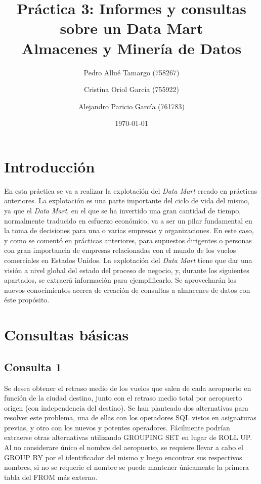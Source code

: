 \documentclass{article}
\begin{document}
\begin{titlepage}
\title{\textbf{
    {\Huge Práctica 3: Informes y consultas sobre un Data Mart}\\
    {\Large Almacenes y Minería de Datos}
}}
\author{
    Pedro Allué Tamargo (758267)
    \and
    Cristina Oriol García (755922)
    \and
    Alejandro Paricio García (761783)
}
\date{\today}
\clearpage\maketitle
\thispagestyle{empty}
\end{titlepage}

\tableofcontents

\newpage
\section{Introducción}

En esta práctica se va a realizar la explotación del \textit{Data Mart} creado en prácticas anteriores. La explotación es una parte importante del ciclo de vida del mismo, ya que el \textit{Data Mart}, en el que se ha invertido una gran cantidad de tiempo, normalmente traducido en esfuerzo económico, va a ser un pilar fundamental en la toma de decisiones para una o varias empresas y organizaciones. En este caso, y como se comentó en prácticas anteriores, para supuestos dirigentes o personas con gran importancia de empresas relacionadas con el mundo de los vuelos comerciales en Estados Unidos. La explotación del \textit{Data Mart} tiene que dar una visión a nivel global del estado del proceso de negocio, y, durante los siguientes apartados, se extraerá información para ejemplificarlo. Se aprovecharán los nuevos conocimientos acerca de creación de consultas a almacenes de datos con éste propósito.\\


\section{Consultas básicas}

\subsection{Consulta 1}
Se desea obtener el retraso medio de los vuelos que salen de cada aeropuerto en función de la ciudad destino, junto con el retraso medio total por aeropuerto origen (con independencia del destino). Se han planteado dos alternativas para resolver este problema, una de ellas con los operadores SQL vistos en asignaturas previas, y otro con los nuevos y potentes operadores. Fácilmente podrían extraerse otras alternativas utilizando GROUPING SET en lugar de ROLL UP. Al no considerare único el nombre del aeropuerto, se requiere llevar a cabo el GROUP BY por el identificador del mismo y luego encontrar sus respectivos nombres, si no se requerie el nombre se puede mantener únicamente la primera tabla del FROM más externo.
\end{document}
